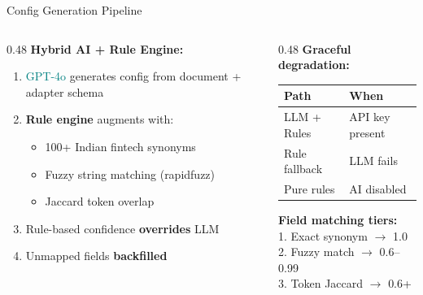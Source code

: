\documentclass[aspectratio=169,11pt]{beamer}
\begin{document}
\begin{frame}{Config Generation Pipeline}
\begin{columns}[T]
\begin{column}{0.48\textwidth}
\textbf{Hybrid AI + Rule Engine:}
\begin{enumerate}
\item \textcolor{teal}{GPT-4o} generates config from document + adapter schema
\item \textbf{Rule engine} augments with:
  \begin{itemize}
  \item 100+ Indian fintech synonyms
  \item Fuzzy string matching (rapidfuzz)
  \item Jaccard token overlap
  \end{itemize}
\item Rule-based confidence \textbf{overrides} LLM
\item Unmapped fields \textbf{backfilled}
\end{enumerate}
\end{column}
\begin{column}{0.48\textwidth}
\textbf{Graceful degradation:}\\[0.3em]
{\small
\begin{tabular}{ll}
\toprule
\textbf{Path} & \textbf{When} \\
\midrule
LLM + Rules & API key present \\
Rule fallback & LLM fails \\
Pure rules & AI disabled \\
\bottomrule
\end{tabular}
}

\vspace{0.5em}
\textbf{Field matching tiers:}\\[0.2em]
{\small
1. Exact synonym $\to$ \textcolor{ok}{1.0}\\
2. Fuzzy match $\to$ \textcolor{warn}{0.6--0.99}\\
3. Token Jaccard $\to$ \textcolor{warn}{0.6+}\\
}
\end{column}
\end{columns}
\end{frame}
\end{document}
